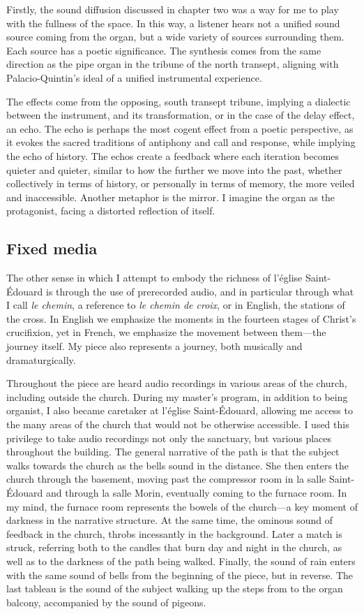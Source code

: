 \documentclass[12pt,twoside,maitrise]{dms_ks}
\theoremstyle{definition}
\begin{document}
{Firstly, the sound diffusion discussed in chapter two was a way for me to play with the fullness of the space. 
In this way, a listener hears not a unified sound source coming from the organ, but a wide variety of sources surrounding them. 
Each source has a poetic significance. 
The synthesis comes from the same direction as the pipe organ in the tribune of the north transept, aligning with Palacio-Quintin's ideal of a unified instrumental experience.

The effects come from the opposing, south transept tribune, implying a dialectic between the instrument, and its transformation, or in the case of the delay effect, an echo. 
The echo is perhaps the most cogent effect from a poetic perspective, as it evokes the sacred traditions of antiphony and call and response, while implying the echo of history. 
The echos create a feedback where each iteration becomes quieter and quieter, similar to how the further we move into the past, whether collectively in terms of history, or personally in terms of memory, the more veiled and inaccessible. 
Another metaphor is the mirror. 
I imagine the organ as the protagonist, facing a distorted reflection of itself.

\subsection{Fixed media}

The other sense in which I attempt to embody the richness of l'église Saint-Édouard is through the use of prerecorded audio, and in particular through what I call \textit{le chemin}, a reference to \textit{le chemin de croix}, or in English, the stations of the cross. 
In English we emphasize the moments in the fourteen stages of Christ's crucifixion, yet in French, we emphasize the movement between them---the journey itself. 
My piece also represents a journey, both musically and dramaturgically. 

Throughout the piece are heard audio recordings in various areas of the church, including outside the church. 
During my master's program, in addition to being organist, I also became caretaker at l'église Saint-Édouard, allowing me access to the many areas of the church that would not be otherwise accessible. 
I used this privilege to take audio recordings not only the sanctuary, but various places throughout the building. 
The general narrative of the path is that the subject walks towards the church as the bells sound in the distance. 
She then enters the church through the basement, moving past the compressor room in la salle Saint-Édouard and through la salle Morin, eventually coming to the furnace room. 
In my mind, the furnace room represents the bowels of the church---a key moment of darkness in the narrative structure. 
At the same time, the ominous sound of feedback in the church, throbs incessantly in the background. 
Later a match is struck, referring both to the candles that burn day and night in the church, as well as to the darkness of the path being walked. 
Finally, the sound of rain enters with the same sound of bells from the beginning of the piece, but in reverse. 
The last tableau is the sound of the subject walking up the steps from to the organ balcony, accompanied by the sound of pigeons.

}
\end{document}
